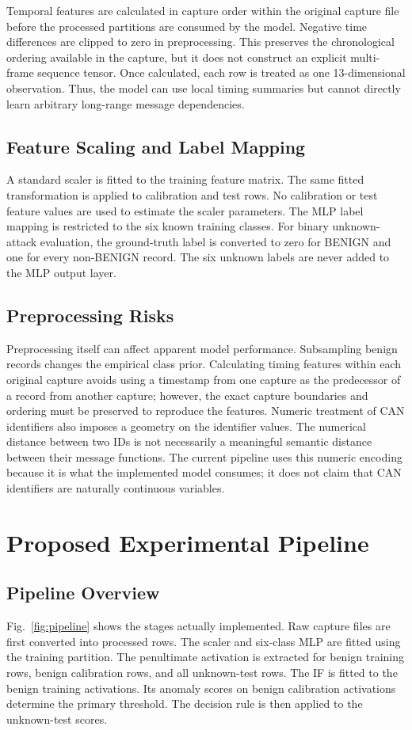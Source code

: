 \documentclass[journal]{IEEEtran}
\begin{document}
Temporal features are calculated in capture order within the original capture file before the processed partitions are consumed by the model. Negative time differences are clipped to zero in preprocessing. This preserves the chronological ordering available in the capture, but it does not construct an explicit multi-frame sequence tensor. Once calculated, each row is treated as one 13-dimensional observation. Thus, the model can use local timing summaries but cannot directly learn arbitrary long-range message dependencies.

\subsection{Feature Scaling and Label Mapping}
A standard scaler is fitted to the training feature matrix. The same fitted transformation is applied to calibration and test rows. No calibration or test feature values are used to estimate the scaler parameters. The MLP label mapping is restricted to the six known training classes. For binary unknown-attack evaluation, the ground-truth label is converted to zero for BENIGN and one for every non-BENIGN record. The six unknown labels are never added to the MLP output layer.

\subsection{Preprocessing Risks}
Preprocessing itself can affect apparent model performance. Subsampling benign records changes the empirical class prior. Calculating timing features within each original capture avoids using a timestamp from one capture as the predecessor of a record from another capture; however, the exact capture boundaries and ordering must be preserved to reproduce the features. Numeric treatment of CAN identifiers also imposes a geometry on the identifier values. The numerical distance between two IDs is not necessarily a meaningful semantic distance between their message functions. The current pipeline uses this numeric encoding because it is what the implemented model consumes; it does not claim that CAN identifiers are naturally continuous variables.

\section{Proposed Experimental Pipeline}
\subsection{Pipeline Overview}
Fig.~\ref{fig:pipeline} shows the stages actually implemented. Raw capture files are first converted into processed rows. The scaler and six-class MLP are fitted using the training partition. The penultimate activation is extracted for benign training rows, benign calibration rows, and all unknown-test rows. The IF is fitted to the benign training activations. Its anomaly scores on benign calibration activations determine the primary threshold. The decision rule is then applied to the unknown-test scores.
\end{document}

